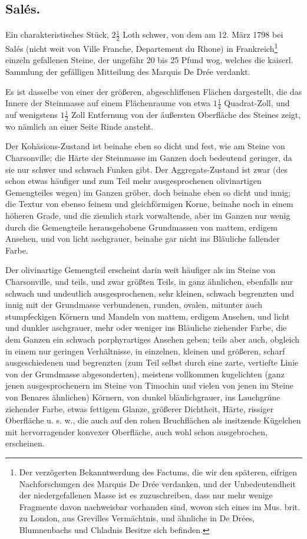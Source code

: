 \documentclass[a4paper, 11pt, oneside, german]{article}
\begin{document}
\subsection{Salés.}
\paragraph{}
Ein charakteristisches Stück, $2\frac{1}{2}$ Loth schwer, von dem am 12. März 1798 bei Salés (nicht weit von Ville Franche, Departement du Rhone) in Frankreich\footnote{Der verzögerten Bekanntwerdung des Factums, die wir den späteren, eifrigen Nachforschungen des Marquis De Drée verdanken, und der Unbedeutendheit der niedergefallenen Masse ist es zuzuschreiben, dass nur mehr wenige Fragmente davon nachweisbar vorhanden sind, wovon sich eines im Mus. brit. zu London, aus Grevilles Vermächtnis, und ähnliche in De Drées, Blumnenbachs und Chladnis Besitze sich befinden.} einzeln gefallenen Steine, der ungefähr 20 bis 25 Pfund wog, welches die kaiserl. Sammlung der gefälligen Mitteilung des Marquis De Drée verdankt.

Es ist dasselbe von einer der größeren, abgeschliffenen Flächen dargestellt, die das Innere der Steinmasse auf einem Flächenraume von etwa $1\frac{1}{4}$ Quadrat-Zoll, und auf wenigstens $1\frac{1}{2}$ Zoll Entfernung von der äußersten Oberfläche des Steines zeigt, wo nämlich an einer Seite Rinde ansteht.

Der Kohäsions-Zustand ist beinahe eben so dicht und fest, wie am Steine von Charsonville; die Härte der Steinmasse im Ganzen doch bedeutend geringer, da sie nur schwer und schwach Funken gibt. Der Aggregats-Zustand ist zwar (des schon etwas häufiger und zum Teil mehr ausgesprochenen olivinartigen Gemengteiles wegen) im Ganzen gröber, doch beinahe eben so dicht und innig; die Textur von ebenso feinem und gleichförmigen Korne, beinahe noch in einem höheren Grade, und die ziemlich stark vorwaltende, aber im Ganzen nur wenig durch die Gemengteile herausgehobene Grundmassen von mattem, erdigem Ansehen, und von licht aschgrauer, beinahe gar nicht ins Bläuliche fallender Farbe.

Der olivinartige Gemengteil erscheint darin weit häufiger als im Steine von Charsonville, und teils, und zwar größten Teils, in ganz ähnlichen, ebenfalls nur schwach und undeutlich ausgesprochenen, sehr kleinen, schwach begrenzten und innig mit der Grundmasse verbundenen, runden, ovalen, mitunter auch stumpfeckigen Körnern und Mandeln von mattem, erdigem Ansehen, und licht und dunkler aschgrauer, mehr oder weniger ins Bläuliche ziehender Farbe, die dem Ganzen ein schwach porphyrartiges Ansehen geben; teils aber auch, obgleich in einem nur geringen Verhältnisse, in einzelnen, kleinen und größeren, scharf ausgeschiedenen und begrenzten (zum Teil selbst durch eine zarte, vertiefte Linie von der Grundmasse abgesonderten), meistens vollkommen kugelichten (ganz jenen ausgesprochenern im Steine von Timochin und vielen von jenen im Steine von Benares ähnlichen) Körnern, von dunkel bläulichgrauer, ins Lauchgrüne ziehender Farbe, etwas fettigem Glanze, größerer Dichtheit, Härte, rissiger Oberfläche u. s. w., die auch auf den rohen Bruchflächen als insitzende Kügelchen mit hervorragender konvexer Oberfläche, auch wohl schon ausgebrochen, erscheinen.
\end{document}
